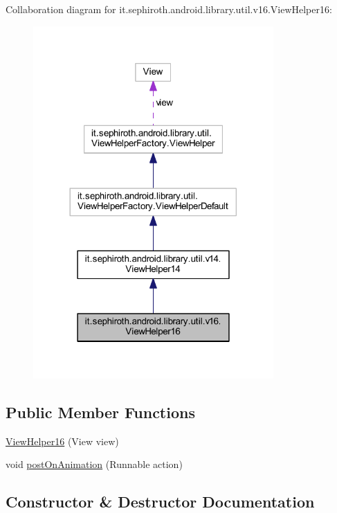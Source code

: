 Collaboration diagram for it.\+sephiroth.\+android.\+library.\+util.\+v16.\+View\+Helper16\+:
\nopagebreak
\begin{figure}[H]
\begin{center}
\leavevmode
\includegraphics[width=260pt]{classit_1_1sephiroth_1_1android_1_1library_1_1util_1_1v16_1_1_view_helper16__coll__graph}
\end{center}
\end{figure}
\subsection*{Public Member Functions}
\begin{DoxyCompactItemize}
\item 
\hyperlink{classit_1_1sephiroth_1_1android_1_1library_1_1util_1_1v16_1_1_view_helper16_a06e39ca8a3e16c6c7ebf902cc9d48f9d}{View\+Helper16} (View view)
\item 
void \hyperlink{classit_1_1sephiroth_1_1android_1_1library_1_1util_1_1v16_1_1_view_helper16_a557cbede1bd2fcb39f1fe329d4b3b243}{post\+On\+Animation} (Runnable action)
\end{DoxyCompactItemize}


\subsection{Constructor \& Destructor Documentation}
\mbox{\label{classit_1_1sephiroth_1_1android_1_1library_1_1util_1_1v16_1_1_view_helper16_a06e39ca8a3e16c6c7ebf902cc9d48f9d}} 

